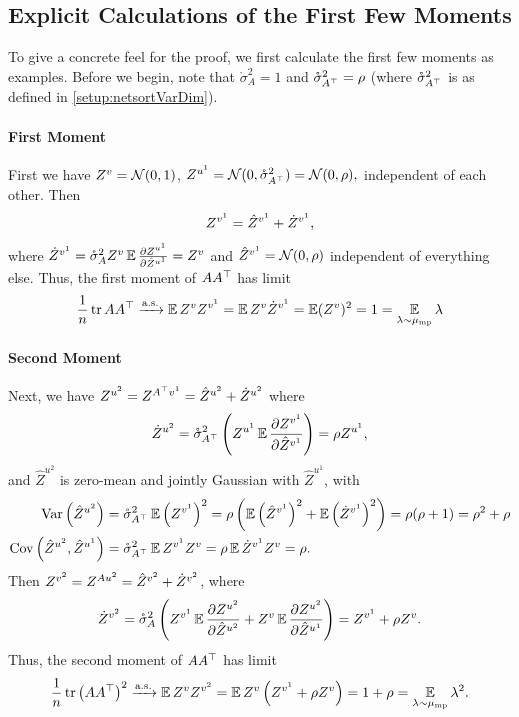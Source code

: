 \documentclass[main.tex]{subfiles}
\begin{document}
\subsection{Explicit Calculations of the First Few Moments}

To give a concrete feel for the proof, we first calculate the first few moments as examples.
Before we begin, note that $\mathring{\sigma}_{A}^{2}=1$ and $\mathring{\sigma}_{A^{\top}}^{2}=\rho$ (where $\mathring{\sigma}_{A^{\top}}^{2}$ is as defined in \cref{setup:netsortVarDim}).

\paragraph*{First Moment}

First we have $Z^{v}=\mathcal{N}(0,1)$, $Z^{u^{1}}=\mathcal{N}(0,\mathring{\sigma}_{A^{\top}}^{2})=\mathcal{N}(0,\rho),$ independent of each other. Then
\[
Z^{v^{1}}=\hat{Z}^{v^{1}}+\dot Z^{v^{1}},
\]
where $\dot Z^{v^{1}}=\mathring{\sigma}_{A}^{2}Z^{v}\operatorname*{\mathbb{E}}\frac{\partial Z^{u^{1}}}{\partial\hat{Z}^{u^{1}}}=Z^{v}$ and $\hat{Z}^{v^{1}}=\mathcal{N}(0,\rho)$ independent of everything else. Thus, the first moment of $AA^{\top}$ has limit
\[
\frac{1}{n}\operatorname{tr} AA^{\top}\xrightarrow{\mathrm{a.s.}}\operatorname*{\mathbb{E}} Z^{v}Z^{v^{1}}=\operatorname*{\mathbb{E}} Z^{v}\dot Z^{v^{1}}=\operatorname*{\mathbb{E}}(Z^{v})^{2}=1=\operatorname*{\mathbb{E}}_{\lambda\sim\mu_{\mathrm{mp}}}\lambda
\]

\paragraph*{Second Moment}

Next, we have $Z^{u^{2}}=Z^{A^{\top}v^{1}}=\hat{Z}^{u^{2}}+\dot Z^{u^{2}}$ where 
\[
\dot Z^{u^{2}}=\mathring{\sigma}_{A^{\top}}^{2}\left(Z^{u^{1}}\operatorname*{\mathbb{E}}\frac{\partial Z^{v^{1}}}{\partial\hat{Z}^{v^{1}}}\right)=\rho Z^{u^{1}},
\]
and $\hat{Z}^{u^{2}}$ is zero-mean and jointly Gaussian with $\hat{Z}^{u^{1}}$, with
\begin{align*}
\operatorname*{\operatorname{Var}}\left(\hat{Z}^{u^{2}}\right) & =\mathring{\sigma}_{A^{\top}}^{2}\operatorname*{\mathbb{E}}\left(Z^{v^{1}}\right)^{2}=\rho\left(\operatorname*{\mathbb{E}}\left(\hat{Z}^{v^{1}}\right)^{2}+\operatorname*{\mathbb{E}}\left(\dot Z^{v^{1}}\right)^{2}\right)=\rho(\rho+1)=\rho^{2}+\rho\\
\operatorname{Cov}\left(\hat{Z}^{u^{2}},\hat{Z}^{u^{1}}\right) & =\mathring{\sigma}_{A^{\top}}^{2}\operatorname*{\mathbb{E}} Z^{v^{1}}Z^{v}=\rho\operatorname*{\mathbb{E}}\dot Z^{v^{1}}Z^{v}=\rho.
\end{align*}
Then $Z^{v^{2}}=Z^{Au^{2}}=\hat{Z}^{v^{2}}+\dot Z^{v^{2}}$, where
\[
\dot Z^{v^{2}}=\mathring{\sigma}_{A}^{2}\left(Z^{v^{1}}\operatorname*{\mathbb{E}}\frac{\partial Z^{u^{2}}}{\partial\hat{Z}^{u^{2}}}+Z^{v}\operatorname*{\mathbb{E}}\frac{\partial Z^{u^{2}}}{\partial\hat{Z}^{u^{1}}}\right)=Z^{v^{1}}+\rho Z^{v}.
\]
Thus, the second moment of $AA^{\top}$ has limit
\[
\frac{1}{n}\operatorname{tr}\left(AA^{\top}\right)^{2}\xrightarrow{\mathrm{a.s.}}\operatorname*{\mathbb{E}} Z^{v}Z^{v^{2}}=\operatorname*{\mathbb{E}} Z^{v}\left(Z^{v^{1}}+\rho Z^{v}\right)=1+\rho=\operatorname*{\mathbb{E}}_{\lambda\sim\mu_{\mathrm{mp}}}\lambda^{2}.
\]
\end{document}
